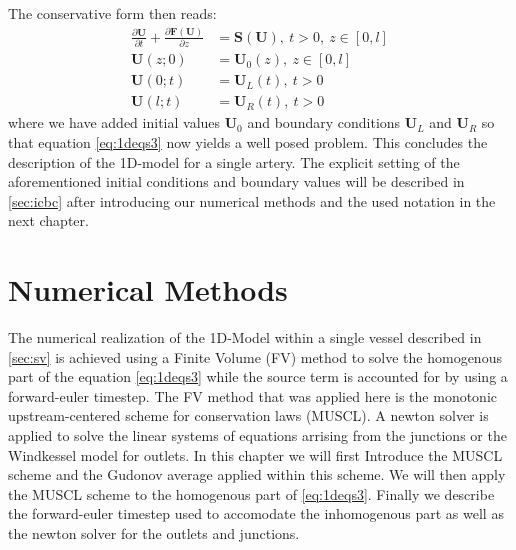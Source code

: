 \documentclass[a4paper, oneside]{discothesis}
\begin{document}
The conservative form then reads:
\begin{equation}
	\begin{aligned}
		\frac{\partial \mathbf{U}}{\partial t} + \frac{\partial \mathbf{F} \left( \mathbf{U} \right)}{\partial z} &= \mathbf{S} \left( \mathbf{U} \right), \ t>0, \ z \in \left[ 0,l \right] \\
		\mathbf{U} \left( z;0 \right) &= \mathbf{U}_0 \left( z \right), \ z \in \left[ 0,l \right] \\
	\mathbf{U} \left( 0;t \right) &= \mathbf{U}_L \left( t \right), \ t>0\\
\mathbf{U} \left( l;t \right) &= \mathbf{U}_R \left( t \right), \ t>0
	\end{aligned} \label{eq:1deqs3}
\end{equation}
where we have added initial values $\mathbf{U}_0$ and boundary conditions $\mathbf{U}_L$ and $\mathbf{U}_R$ so that equation \ref{eq:1deqs3} now yields a well posed problem.\cite{formaggia2010cardiovascular}
This concludes the description of the 1D-model for a single artery.
The explicit setting of the aforementioned initial conditions and boundary values will be described in \autoref{sec:icbc} after introducing our numerical methods and the used notation in the next chapter.





\chapter{Numerical Methods} \label{chap:nm}
The numerical realization of the 1D-Model within a single vessel described in \autoref{sec:sv} is achieved using a Finite Volume (FV) method to solve the homogenous part of the equation \autoref{eq:1deqs3} while the source term is accounted for by using a forward-euler timestep. 
The FV method that was applied here is the monotonic upstream-centered scheme for conservation laws (MUSCL).
A newton solver is applied to solve the linear systems of equations arrising from the junctions or the Windkessel model for outlets.
In this chapter we will first Introduce the MUSCL scheme and the Gudonov average applied within this scheme.
We will then apply the MUSCL scheme to the homogenous part of \autoref{eq:1deqs3}.
Finally we describe the forward-euler timestep used to accomodate the inhomogenous part as well as the newton solver for the outlets and junctions.
\end{document}
